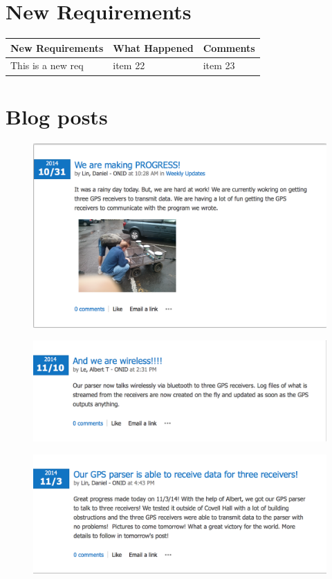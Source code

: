\documentclass[12pt]{article}
\begin{document}
\section{New Requirements}
\begin{center}
\begin{tabu} to 0.8\textwidth { | X[l] | X[c] | X[r] | }
 \hline
 New Requirements & What Happened & Comments \\
 \hline
 This is a new req & item 22  & item 23  \\
\hline
\end{tabu}
\end{center}
\clearpage
\section{Blog posts}

\begin{figure}[H]
\centering
\includegraphics[scale=0.5]{blog_posts/2014_10_31.png}
\end{figure}

\begin{figure}[H]
\centering
\includegraphics[scale=0.5]{blog_posts/2014-11_10.png}
\end{figure}

\begin{figure}[H]
\centering
\includegraphics[scale=0.5]{blog_posts/2014_11_3.png}
\label{fig:my_label}
\end{figure}
\end{document}
